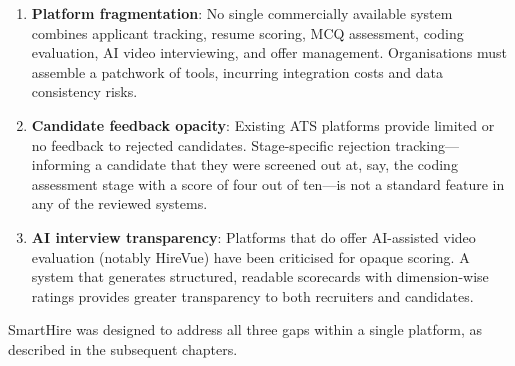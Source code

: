 \begin{enumerate}[leftmargin=1.5em]
  \item \textbf{Platform fragmentation}: No single commercially available system combines applicant tracking, resume scoring, MCQ assessment, coding evaluation, AI video interviewing, and offer management. Organisations must assemble a patchwork of tools, incurring integration costs and data consistency risks.

  \item \textbf{Candidate feedback opacity}: Existing ATS platforms provide limited or no feedback to rejected candidates. Stage-specific rejection tracking---informing a candidate that they were screened out at, say, the coding assessment stage with a score of four out of ten---is not a standard feature in any of the reviewed systems.

  \item \textbf{AI interview transparency}: Platforms that do offer AI-assisted video evaluation (notably HireVue) have been criticised for opaque scoring. A system that generates structured, readable scorecards with dimension-wise ratings provides greater transparency to both recruiters and candidates.
\end{enumerate}

SmartHire was designed to address all three gaps within a single platform, as described in the subsequent chapters.
